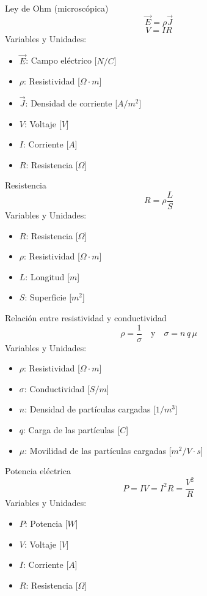 \documentclass{article}
\begin{document}
\begin{multicols}{3}
\begin{teorema}{Ley de Ohm (microscópica)}
    $$\vec{E} = \rho \vec{J}$$
    $$V = IR$$
    Variables y Unidades:
    \begin{itemize}
        \item $\vec{E}$: Campo eléctrico [$N/C$]
        \item $\rho$: Resistividad [$\Omega \cdot m$]
        \item $\vec{J}$: Densidad de corriente [$A/m^2$]
        \item $V$: Voltaje [$V$]
        \item $I$: Corriente [$A$]
        \item $R$: Resistencia [$\Omega$]
    \end{itemize}
\end{teorema}

\begin{teorema}{Resistencia}
    $$R = \rho \frac{L}{S}$$
    Variables y Unidades:
    \begin{itemize}
        \item $R$: Resistencia [$\Omega$]
        \item $\rho$: Resistividad [$\Omega \cdot m$]
        \item $L$: Longitud [$m$]
        \item $S$: Superficie [$m^2$]
    \end{itemize}
\end{teorema}

\begin{teorema}{Relación entre resistividad y conductividad}
    $$\rho = \frac{1}{\sigma} \quad \text{y} \quad \sigma = n \, q \, \mu$$
    Variables y Unidades:
    \begin{itemize}
        \item $\rho$: Resistividad [$\Omega \cdot m$]
        \item $\sigma$: Conductividad [$S/m$]
        \item $n$: Densidad de partículas cargadas [$1/m^3$]
        \item $q$: Carga de las partículas [$C$]
        \item $\mu$: Movilidad de las partículas cargadas [$m^2/V \cdot s$]
    \end{itemize}
\end{teorema}

\begin{teorema}{Potencia eléctrica}
    $$P = I V = I^2 R = \frac{V^2}{R}$$
    Variables y Unidades:
    \begin{itemize}
        \item $P$: Potencia [$W$]
        \item $V$: Voltaje [$V$]
        \item $I$: Corriente [$A$]
        \item $R$: Resistencia [$\Omega$]
    \end{itemize}
\end{teorema}

\end{multicols}
\end{document}
